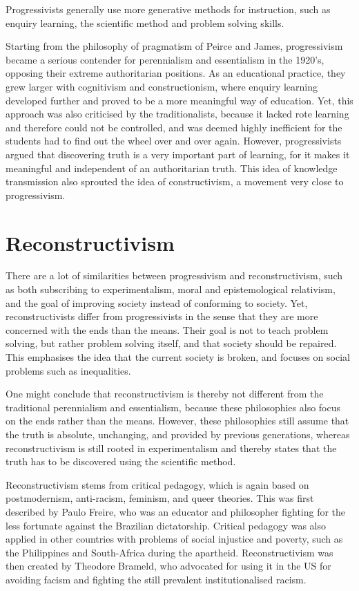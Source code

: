Progressivists generally use more generative methods for instruction, such as enquiry learning, the scientific method and problem solving skills.

Starting from the philosophy of pragmatism of Peirce and James, progressivism became a serious contender for perennialism and essentialism in the 1920's, opposing their extreme authoritarian positions. As an educational practice, they grew larger with cognitivism and constructionism, where enquiry learning developed further and proved to be a more meaningful way of education. Yet, this approach was also criticised by the traditionalists, because it lacked rote learning and therefore could not be controlled, and was deemed highly inefficient for the students had to find out the wheel over and over again. However, progressivists argued that discovering truth is a very important part of learning, for it makes it meaningful and independent of an authoritarian truth. This idea of knowledge transmission also sprouted the idea of constructivism, a movement very close to progressivism.

\section{Reconstructivism}

There are a lot of similarities between progressivism and reconstructivism, such as both subscribing to experimentalism, moral and epistemological relativism, and the goal of improving society instead of conforming to society. Yet, reconstructivists differ from progressivists in the sense that they are more concerned with the ends than the means. Their goal is not to teach problem solving, but rather problem solving itself, and that society should be repaired. This emphasises the idea that the current society is broken, and focuses on social problems such as inequalities.

One might conclude that reconstructivism is thereby not different from the traditional perennialism and essentialism, because these philosophies also focus on the ends rather than the means. However, these philosophies still assume that the truth is absolute, unchanging, and provided by previous generations, whereas reconstructivism is still rooted in experimentalism and thereby states that the truth has to be discovered using the scientific method.

Reconstructivism stems from critical pedagogy, which is again based on postmodernism, anti-racism, feminism, and queer theories. This was first described by Paulo Freire, who was an educator and philosopher fighting for the less fortunate against the Brazilian dictatorship. Critical pedagogy was also applied in other countries with problems of social injustice and poverty, such as the Philippines and South-Africa during the apartheid. Reconstructivism was then created by Theodore Brameld, who advocated for using it in the US for avoiding facism and fighting the still prevalent institutionalised racism.

